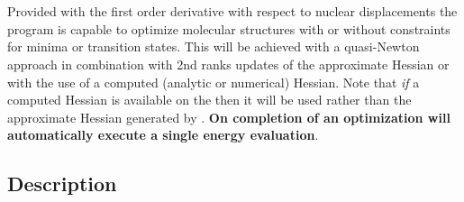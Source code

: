
\section{}
\label{UG:sec:SlapAf}

Provided with the first order derivative with respect to nuclear displacements
the program is capable to optimize molecular structures with or
without constraints for minima or
transition states. This will be achieved with a quasi-Newton approach
in combination with 2nd ranks updates of the approximate Hessian or
with the use of a computed (analytic or numerical) Hessian.
Note that {\it if} a computed Hessian is available on the
 then it will be used rather than the approximate Hessian generated by .
{\bf On completion of an optimization  will automatically execute a single energy evaluation}.

\subsection{Description}
\label{UG:sec:SlapAf_description}

